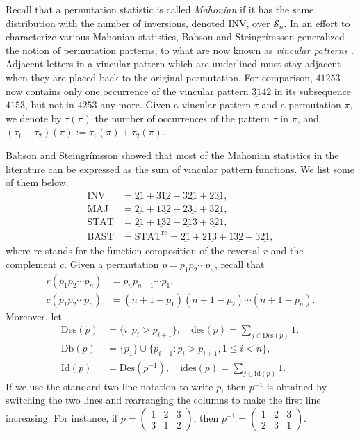 \documentclass[12pt]{amsart}
\numberwithin{equation}{section}
\theoremstyle{plain}
\theoremstyle{definition}
\def\INV{\mathrm{INV}}
\def\MAJ{\mathrm{MAJ}}
\def\STAT{\mathrm{STAT}}
\def\BAST{\mathrm{BAST}}
\def\des{\mathrm{des}}
\def\ides{\mathrm{ides}}
\def\rc{\mathrm{rc}}
\def\Des{\mathrm{Des}}
\def\Db{\mathrm{Db}}
\def\Id{\mathrm{Id}}
\def\SS{\mathcal{S}}
\begin{document}
Recall that a permutation statistic is called \emph{Mahonian} if it has the same distribution with the number of inversions, denoted $\INV$, over $\SS_n$. In an effort to characterize various Mahonian statistics, Babson and Steingr\'{i}msson \cite{BS} generalized the notion of permutation patterns, to what are now known as \emph{vincular patterns} \cite[Chap.~1.3 and Chap.~7]{Kit}. Adjacent letters in a vincular pattern which are
 underlined must stay adjacent when they are placed  back to the original permutation. 
 For comparison, $41253$ now contains only one occurrence of the vincular pattern $\underline{31}42$ in its subsequence $4153$, but not in $4253$ any more. Given a vincular pattern $\tau$ and a permutation $\pi$, we denote by $\tau(\pi)$ the number of occurrences of the pattern $\tau$ in $\pi$, and $(\tau_1+\tau_2)(\pi):=\tau_1(\pi)+\tau_2(\pi)$.

  Babson and Steingr\'{i}msson \cite{BS} showed that most of the Mahonian statistics in the literature can be expressed as the sum of vincular pattern functions. We list some of them below.
\begin{align*}
\INV &=\underline{21}+3\underline{12}+3\underline{21}+2\underline{31},\\
\MAJ &=\underline{21}+1\underline{32}+2\underline{31}+3\underline{21},\\

\STAT &=\underline{21}+\underline{13}2+\underline{21}3+\underline{32}1,\\
\BAST &=\STAT^{\rc}=\underline{21}+2\underline{13}+1\underline{32}+3\underline{21},
\end{align*}
where $\rc$ stands for the function composition of the reversal $r$ and the complement $c$. Given a permutation $p=p_1 p_2 \cdots p_n$, recall that
\begin{align*}
r(p_1p_2\cdots p_n) &=p_np_{n-1}\cdots p_1,\\
c(p_1p_2\cdots p_n) &=(n+1-p_1)(n+1-p_2)\cdots(n+1-p_n).
\end{align*}
Moreover, let
\begin{align*}
\Des(p)&=\{i:p_i > p_{i+1}\}, \quad \des(p)= \sum_{j\in \Des(p)}1,\\[3pt]
\Db(p)&=\{p_1\}\cup\{p_{i+1}:p_i>p_{i+1}, 1\leq i<n\},\\[3pt]
\Id(p)&= \Des(p^{-1}), \quad
\ides(p) = \sum_{j\in \Id(p)}1.
\end{align*}
If we use the standard two-line notation to write $p$, then $p^{-1}$ is obtained by switching the two lines and rearranging the columns to make the first line increasing. For instance, if $p=\left(\begin{array}{ccc} 1 & 2 & 3\\ 3 & 1 & 2\end{array}\right)$, then $p^{-1}=\left(\begin{array}{ccc} 1 & 2 & 3\\ 2 & 3 & 1 \end{array}\right)$.
\end{document}
